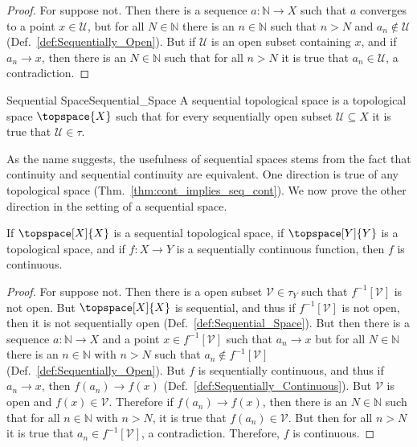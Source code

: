 \documentclass{article}                                                        %
\begin{document}
            \begin{proof}
                For suppose not. Then there is a sequence
                $a:\mathbb{N}\rightarrow{X}$ such that $a$ converges to a point
                $x\in\mathcal{U}$, but for all $N\in\mathbb{N}$ there is an
                $n\in\mathbb{N}$ such that $n>N$ and $a_{n}\notin\mathcal{U}$
                (Def.~\ref{def:Sequentially_Open}). But if $\mathcal{U}$ is an open
                subset containing $x$, and if $a_{n}\rightarrow{x}$, then there is
                an $N\in\mathbb{N}$ such that for all $n>N$ it is true that
                $a_{n}\in\mathcal{U}$, a contradiction.
            \end{proof}
            \begin{fdefinition}{Sequential Space}{Sequential_Space}
                A sequential topological space is a topological space
                $\topspace{X}$ such that for every sequentially open subset
                $\mathcal{U}\subseteq{X}$ it is true that $\mathcal{U}\in\tau$.
            \end{fdefinition}
            As the name suggests, the usefulness of sequential spaces stems from the
            fact that continuity and sequential continuity are equivalent. One
            direction is true of any topological space
            (Thm.~\ref{thm:cont_implies_seq_cont}). We now prove the other direction
            in the setting of a sequential space.
            \begin{theorem}
                \label{thm:seq_space_seq_cont_eqiv_cont}%
                If $\topspace[X]{X}$ is a sequential topological space, if
                $\topspace[Y]{Y}$ is a topological space, and if $f:X\rightarrow{Y}$
                is a sequentially continuous function, then $f$ is continuous.
            \end{theorem}
            \begin{proof}
                For suppose not. Then there is a open subset
                $\mathcal{V}\in\tau_{Y}$ such that $f^{\minus{1}}[\mathcal{V}]$ is
                not open. But $\topspace[X]{X}$ is sequential, and thus if
                $f^{\minus{1}}[\mathcal{V}]$ is not open, then it is not
                sequentially open (Def.~\ref{def:Sequential_Space}). But then there
                is a sequence $a:\mathbb{N}\rightarrow{X}$ and a point
                $x\in{f}^{\minus{1}}[\mathcal{V}]$ such that $a_{n}\rightarrow{x}$
                but for all $N\in\mathbb{N}$ there is an $n\in\mathbb{N}$ with
                $n>N$ such that $a_{n}\notin{f}^{\minus{1}}[\mathcal{V}]$
                (Def.~\ref{def:Sequentially_Open}). But $f$ is sequentially
                continuous, and thus if $a_{n}\rightarrow{x}$, then
                $f(a_{n})\rightarrow{f}(x)$
                (Def.~\ref{def:Sequentially_Continuous}). But $\mathcal{V}$ is open
                and $f(x)\in\mathcal{V}$. Therefore if $f(a_{n})\rightarrow{f}(x)$,
                then there is an $N\in\mathbb{N}$ such that for all $n\in\mathbb{N}$
                with $n>N$, it is true that $f(a_{n})\in\mathcal{V}$. But then for
                all $n>N$ it is true that $a_{n}\in{f}^{\minus{1}}[\mathcal{V}]$, a
                contradiction. Therefore, $f$ is continuous.
            \end{proof}
\end{document}
